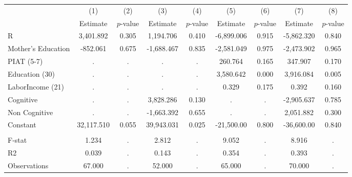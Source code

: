 \begin{tabular}{lcccccccc} \toprule
 & (1) & (2) & (3) & (4) & (5) & (6) & (7) & (8) \\ 
 & Estimate  & $p$-value  & Estimate  & $p$-value  & Estimate  & $p$-value  & Estimate  & $p$-value  \\  \midrule
R &  3,401.892 &     0.305 &  1,194.706 &     0.410 & -6,899.006 &     0.915 & -5,862.320 &     0.840 \\  
Mother's Education &  -852.061 &     0.675 & -1,688.467 &     0.835 & -2,581.049 &     0.975 & -2,473.902 &     0.965 \\  
PIAT (5-7) &         . &         . &         . &         . &   260.764 &     0.165 &   347.907 &     0.170 \\  
Education (30) &         . &         . &         . &         . &  3,580.642 &     0.000 &  3,916.084 &     0.005 \\  
LaborIncome (21) &         . &         . &         . &         . &     0.329 &     0.175 &     0.392 &     0.160 \\  
Cognitive &         . &         . &  3,828.286 &     0.130 &         . &         . & -2,905.637 &     0.785 \\  
Non Cognitive &         . &         . & -1,663.392 &     0.655 &         . &         . &  2,051.882 &     0.300 \\  
Constant & 32,117.510 &     0.055 & 39,943.031 &     0.025 & -21,500.00 &     0.800 & -36,600.00 &     0.840 \\  \\ \midrule
F-stat &     1.234 &         . &     2.812 &         . &     9.052 &         . &     8.916 &         . \\  
R2 &     0.039 &         . &     0.143 &         . &     0.354 &         . &     0.393 &         . \\  
Observations &    67.000 &         . &    52.000 &         . &    65.000 &         . &    70.000 &         . \\  
\bottomrule \end{tabular}
